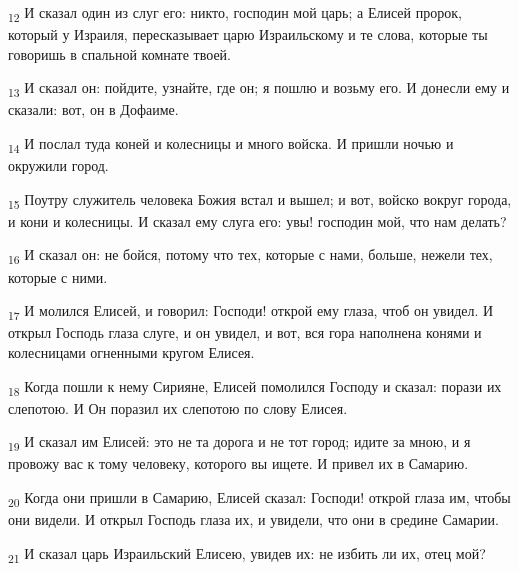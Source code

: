 \begin{tcolorbox}
\textsubscript{12} И сказал один из слуг его: никто, господин мой царь; а Елисей пророк, который у Израиля, пересказывает царю Израильскому и те слова, которые ты говоришь в спальной комнате твоей.
\end{tcolorbox}
\begin{tcolorbox}
\textsubscript{13} И сказал он: пойдите, узнайте, где он; я пошлю и возьму его. И донесли ему и сказали: вот, он в Дофаиме.
\end{tcolorbox}
\begin{tcolorbox}
\textsubscript{14} И послал туда коней и колесницы и много войска. И пришли ночью и окружили город.
\end{tcolorbox}
\begin{tcolorbox}
\textsubscript{15} Поутру служитель человека Божия встал и вышел; и вот, войско вокруг города, и кони и колесницы. И сказал ему слуга его: увы! господин мой, что нам делать?
\end{tcolorbox}
\begin{tcolorbox}
\textsubscript{16} И сказал он: не бойся, потому что тех, которые с нами, больше, нежели тех, которые с ними.
\end{tcolorbox}
\begin{tcolorbox}
\textsubscript{17} И молился Елисей, и говорил: Господи! открой ему глаза, чтоб он увидел. И открыл Господь глаза слуге, и он увидел, и вот, вся гора наполнена конями и колесницами огненными кругом Елисея.
\end{tcolorbox}
\begin{tcolorbox}
\textsubscript{18} Когда пошли к нему Сирияне, Елисей помолился Господу и сказал: порази их слепотою. И Он поразил их слепотою по слову Елисея.
\end{tcolorbox}
\begin{tcolorbox}
\textsubscript{19} И сказал им Елисей: это не та дорога и не тот город; идите за мною, и я провожу вас к тому человеку, которого вы ищете. И привел их в Самарию.
\end{tcolorbox}
\begin{tcolorbox}
\textsubscript{20} Когда они пришли в Самарию, Елисей сказал: Господи! открой глаза им, чтобы они видели. И открыл Господь глаза их, и увидели, что они в средине Самарии.
\end{tcolorbox}
\begin{tcolorbox}
\textsubscript{21} И сказал царь Израильский Елисею, увидев их: не избить ли их, отец мой?
\end{tcolorbox}
